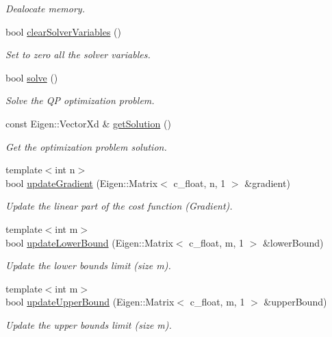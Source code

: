 \begin{DoxyCompactItemize}
\begin{DoxyCompactList}\small\item\em Dealocate memory. \end{DoxyCompactList}\item 
bool \hyperlink{classOsqpEigen_1_1Solver_a11605685ef645c991b1f7935d1b854f4}{clear\+Solver\+Variables} ()
\begin{DoxyCompactList}\small\item\em Set to zero all the solver variables. \end{DoxyCompactList}\item 
bool \hyperlink{classOsqpEigen_1_1Solver_aade83b0e68b85d47d41a054f04d413aa}{solve} ()
\begin{DoxyCompactList}\small\item\em Solve the QP optimization problem. \end{DoxyCompactList}\item 
const Eigen\+::\+Vector\+Xd \& \hyperlink{classOsqpEigen_1_1Solver_a192a5f94034d4e467c6b557c2e06dd66}{get\+Solution} ()
\begin{DoxyCompactList}\small\item\em Get the optimization problem solution. \end{DoxyCompactList}\item 
{\footnotesize template$<$int n$>$ }\\bool \hyperlink{classOsqpEigen_1_1Solver_a7d1d9fdd8db3201a0ca2dcafbc289eea}{update\+Gradient} (Eigen\+::\+Matrix$<$ c\+\_\+float, n, 1 $>$ \&gradient)
\begin{DoxyCompactList}\small\item\em Update the linear part of the cost function (Gradient). \end{DoxyCompactList}\item 
{\footnotesize template$<$int m$>$ }\\bool \hyperlink{classOsqpEigen_1_1Solver_a48764153cec5e618021ab79586cc71b6}{update\+Lower\+Bound} (Eigen\+::\+Matrix$<$ c\+\_\+float, m, 1 $>$ \&lower\+Bound)
\begin{DoxyCompactList}\small\item\em Update the lower bounds limit (size m). \end{DoxyCompactList}\item 
{\footnotesize template$<$int m$>$ }\\bool \hyperlink{classOsqpEigen_1_1Solver_a69f1db45e10dae9c186cc0561532f018}{update\+Upper\+Bound} (Eigen\+::\+Matrix$<$ c\+\_\+float, m, 1 $>$ \&upper\+Bound)
\begin{DoxyCompactList}\small\item\em Update the upper bounds limit (size m). \end{DoxyCompactList}\item 

\end{DoxyCompactItemize}
